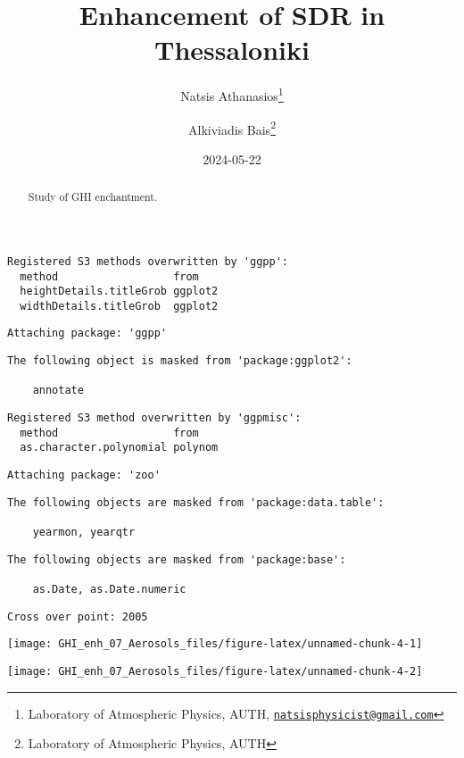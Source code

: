 \documentclass[
  10pt,
  a4paper,oneside]{article}
\title{Enhancement of SDR in Thessaloniki}
\author{Natsis Athanasios\footnote{Laboratory of Atmospheric Physics, AUTH, \href{mailto:natsisphysicist@gmail.com}{\nolinkurl{natsisphysicist@gmail.com}}} \and Alkiviadis Bais\footnote{Laboratory of Atmospheric Physics, AUTH}}
\date{2024-05-22}
\begin{document}
\maketitle
\begin{abstract}
Study of GHI enchantment.
\end{abstract}

{
\hypersetup{linkcolor=}
\setcounter{tocdepth}{4}
\tableofcontents
}
\begin{verbatim}
Registered S3 methods overwritten by 'ggpp':
  method                  from   
  heightDetails.titleGrob ggplot2
  widthDetails.titleGrob  ggplot2
\end{verbatim}

\begin{verbatim}
Attaching package: 'ggpp'
\end{verbatim}

\begin{verbatim}
The following object is masked from 'package:ggplot2':

    annotate
\end{verbatim}

\begin{verbatim}
Registered S3 method overwritten by 'ggpmisc':
  method                  from   
  as.character.polynomial polynom
\end{verbatim}

\begin{verbatim}
Attaching package: 'zoo'
\end{verbatim}

\begin{verbatim}
The following objects are masked from 'package:data.table':

    yearmon, yearqtr
\end{verbatim}

\begin{verbatim}
The following objects are masked from 'package:base':

    as.Date, as.Date.numeric
\end{verbatim}

\begin{verbatim}
Cross over point: 2005 
\end{verbatim}

\begin{center}\texttt{[image: GHI\_enh\_07\_Aerosols\_files/figure-latex/unnamed-chunk-4-1]} \end{center}

\begin{center}\texttt{[image: GHI\_enh\_07\_Aerosols\_files/figure-latex/unnamed-chunk-4-2]} \end{center}
\end{document}
